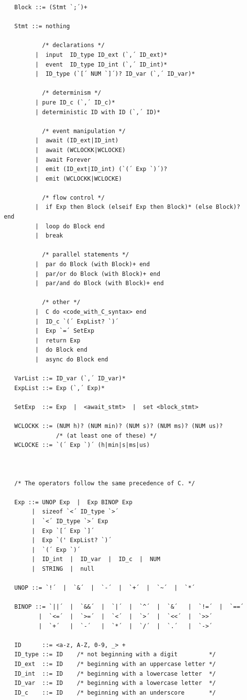 \documentclass[11pt,a4paper]{article}
\newcommand{\2}{\;\;}
\newcommand{\5}{\;\;\;\;\;}
\begin{document}
\begin{verbatim}
   Block ::= (Stmt `;´)+
   
   Stmt ::= nothing
   
           /* declarations */
         |  input  ID_type ID_ext (`,´ ID_ext)*
         |  event  ID_type ID_int (`,´ ID_int)*
         |  ID_type (`[´ NUM `]´)? ID_var (`,´ ID_var)*
   
           /* determinism */
         | pure ID_c (`,´ ID_c)*
         | deterministic ID with ID (`,´ ID)*
   
           /* event manipulation */
         |  await (ID_ext|ID_int)
         |  await (WCLOCKK|WCLOCKE)
         |  await Forever
         |  emit (ID_ext|ID_int) (`(´ Exp `)´)?
         |  emit (WCLOCKK|WCLOCKE)
   
           /* flow control */
         |  if Exp then Block (elseif Exp then Block)* (else Block)? end
         |  loop do Block end
         |  break
   
           /* parallel statements */
         |  par do Block (with Block)+ end
         |  par/or do Block (with Block)+ end
         |  par/and do Block (with Block)+ end
   
           /* other */
         |  C do <code_with_C_syntax> end
         |  ID_c `(´ ExpList? `)´
         |  Exp `=´ SetExp
         |  return Exp
         |  do Block end
         |  async do Block end
   
   VarList ::= ID_var (`,´ ID_var)*
   ExpList ::= Exp (`,´ Exp)*
   
   SetExp  ::= Exp  |  <await_stmt>  |  set <block_stmt>
   
   WCLOCKK ::= (NUM h)? (NUM min)? (NUM s)? (NUM ms)? (NUM us)?
               /* (at least one of these) */
   WCLOCKE ::= `(´ Exp `)´ (h|min|s|ms|us)
   


   /* The operators follow the same precedence of C. */
   
   Exp ::= UNOP Exp  |  Exp BINOP Exp
        |  sizeof `<´ ID_type `>´
        |  `<´ ID_type `>´ Exp
        |  Exp `[´ Exp `]´
        |  Exp `(' ExpList? `)´
        |  `(´ Exp `)´
        |  ID_int  |  ID_var  |  ID_c  |  NUM
        |  STRING  |  null
   
   UNOP ::= `!´  |  `&´  |  `-´  |  `+´  |  `~´  |  `*´
   
   BINOP ::= `||´  |  `&&´  |  `|´  |  `^´  |  `&´   |  `!=´  |  `==´
          |  `<=´  |  `>=´  |  `<´  |  `>´  |  `<<´  |  `>>´
          |  `+´   |  `-´   |  `*´  |  `/´  |  `.´   |  `->´
   
   ID      ::= <a-z, A-Z, 0-9, _> +
   ID_type ::= ID    /* not beginning with a digit         */
   ID_ext  ::= ID    /* beginning with an uppercase letter */
   ID_int  ::= ID    /* beginning with a lowercase letter  */
   ID_var  ::= ID    /* beginning with a lowercase letter  */
   ID_c    ::= ID    /* beginning with an underscore       */
\end{verbatim}

\end{document}
